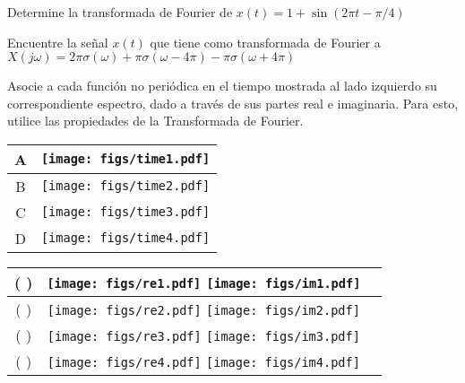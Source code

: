 
\begin{ejercicio}
    Determine la transformada de Fourier de $x(t)=1+\sin(2\pi t-\pi/4)$
\end{ejercicio}

\begin{ejercicio}
    Encuentre la señal $x(t)$ que tiene como transformada de Fourier a $X(j\omega) = 2\pi \sigma (\omega) + \pi \sigma (\omega-4\pi) - \pi \sigma (\omega + 4\pi)$
\end{ejercicio}

\begin{ejercicio}
    Asocie a cada función no periódica en el tiempo mostrada al lado izquierdo su correspondiente espectro, dado a través de sus partes real e imaginaria. Para esto, utilice las propiedades de la Transformada de Fourier.\\[15pt]
    \begin{minipage}{5in}
        \begin{tabular}{|c|l|}
            \hline
            A & \texttt{[image: figs/time1.pdf]}\\
            \hline
            B & \texttt{[image: figs/time2.pdf]}\\
            \hline
            C & \texttt{[image: figs/time3.pdf]}\\
            \hline
            D & \texttt{[image: figs/time4.pdf]}\\
            \hline
        \end{tabular}
    \hspace{0.4cm}
        \begin{tabular}{|c|c|c|}
            \hline
                (  ) &
                \texttt{[image: figs/re1.pdf]}
                \texttt{[image: figs/im1.pdf]}
            \\
            \hline
                (  ) &
                \texttt{[image: figs/re2.pdf]}
                \texttt{[image: figs/im2.pdf]}
            \\
            \hline
                (  ) &
                \texttt{[image: figs/re3.pdf]}
                \texttt{[image: figs/im3.pdf]}
            \\
            \hline
                (  ) &
                \texttt{[image: figs/re4.pdf]}
                \texttt{[image: figs/im4.pdf]}
            \\
            \hline
        \end{tabular}
    \end{minipage}
\end{ejercicio}

